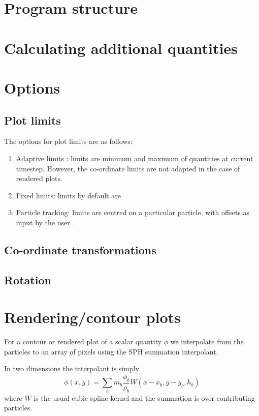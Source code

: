 \documentclass[a4paper,12pt]{article}
\begin{document}
\section{Program structure}

\section{Calculating additional quantities}

\section{Options}

\subsection{Plot limits}
 The options for plot limits are as follows:
\begin{enumerate}
\item Adaptive limits : limits are minimum and maximum of quantities at current
timestep. However, the co-ordinate limits are not adapted in the case of
rendered plots.
\item Fixed limits: limits by default are
\item Particle tracking: limits are centred on a particular particle, with
offsets as input by the user.
\end{enumerate}

\subsection{Co-ordinate transformations}

\subsection{Rotation}

\section{Rendering/contour plots}
 For a contour or rendered plot of a scalar quantity $\phi$ we
interpolate from the particles to an array of pixels using the SPH summation
interpolant.

In two dimensions the interpolant is simply
\begin{equation}
\phi(x,y) = \sum_b m_b \frac{\phi_b}{\rho_b} W(x - x_b, y-y_b, h_b)
\end{equation}
where $W$ is the usual cubic spline kernel and the summation is over
contributing particles.
\end{document}
